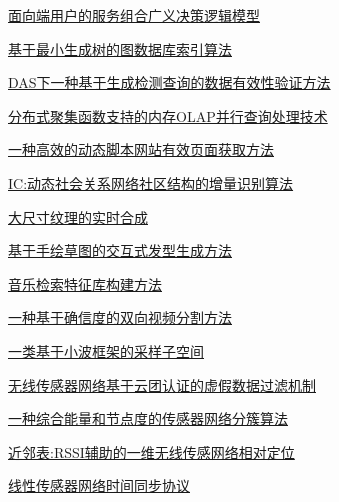 \documentclass[a4paper]{article}
\begin{document}
\href{http://www.jos.org.cn/ch/reader/download_pdf.aspx?file_no=09017&year_id=2009&quarter_id=zk&falg=1}{面向端用户的服务组合广义决策逻辑模型}

\href{http://www.jos.org.cn/ch/reader/download_pdf.aspx?file_no=09018&year_id=2009&quarter_id=zk&falg=1}{基于最小生成树的图数据库索引算法}

\href{http://www.jos.org.cn/ch/reader/download_pdf.aspx?file_no=09019&year_id=2009&quarter_id=zk&falg=1}{DAS下一种基于生成检测查询的数据有效性验证方法}

\href{http://www.jos.org.cn/ch/reader/download_pdf.aspx?file_no=09020&year_id=2009&quarter_id=zk&falg=1}{分布式聚集函数支持的内存OLAP并行查询处理技术}

\href{http://www.jos.org.cn/ch/reader/download_pdf.aspx?file_no=09021&year_id=2009&quarter_id=zk&falg=1}{一种高效的动态脚本网站有效页面获取方法}

\href{http://www.jos.org.cn/ch/reader/download_pdf.aspx?file_no=09022&year_id=2009&quarter_id=zk&falg=1}{IC:动态社会关系网络社区结构的增量识别算法}

\href{http://www.jos.org.cn/ch/reader/download_pdf.aspx?file_no=09023&year_id=2009&quarter_id=zk&falg=1}{大尺寸纹理的实时合成}

\href{http://www.jos.org.cn/ch/reader/download_pdf.aspx?file_no=09024&year_id=2009&quarter_id=zk&falg=1}{基于手绘草图的交互式发型生成方法}

\href{http://www.jos.org.cn/ch/reader/download_pdf.aspx?file_no=09025&year_id=2009&quarter_id=zk&falg=1}{音乐检索特征库构建方法}

\href{http://www.jos.org.cn/ch/reader/download_pdf.aspx?file_no=09026&year_id=2009&quarter_id=zk&falg=1}{一种基于确信度的双向视频分割方法}

\href{http://www.jos.org.cn/ch/reader/download_pdf.aspx?file_no=09027&year_id=2009&quarter_id=zk&falg=1}{一类基于小波框架的采样子空间}

\href{http://www.jos.org.cn/ch/reader/download_pdf.aspx?file_no=09028&year_id=2009&quarter_id=zk&falg=1}{无线传感器网络基于云团认证的虚假数据过滤机制}

\href{http://www.jos.org.cn/ch/reader/download_pdf.aspx?file_no=09029&year_id=2009&quarter_id=zk&falg=1}{一种综合能量和节点度的传感器网络分簇算法}

\href{http://www.jos.org.cn/ch/reader/download_pdf.aspx?file_no=09030&year_id=2009&quarter_id=zk&falg=1}{近邻表:RSSI辅助的一维无线传感网络相对定位}

\href{http://www.jos.org.cn/ch/reader/download_pdf.aspx?file_no=09031&year_id=2009&quarter_id=zk&falg=1}{线性传感器网络时间同步协议}
\end{document}
